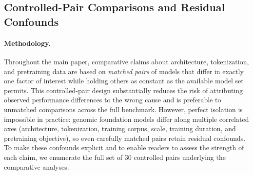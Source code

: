 \documentclass{llmxive}
\begin{document}
\subsection{Controlled-Pair Comparisons and Residual Confounds}
\label{subsec:controlled_pairs}

\paragraph{Methodology.}
Throughout the main paper, comparative claims about architecture,
tokenization, and pretraining data are based on \emph{matched pairs} of
models that differ in exactly one factor of interest while holding others
as constant as the available model set permits. This controlled-pair
design substantially reduces the risk of attributing observed performance
differences to the wrong cause and is preferable to unmatched comparisons
across the full benchmark. However, perfect isolation is impossible in
practice: genomic foundation models differ along multiple correlated
axes (architecture, tokenization, training corpus, scale, training
duration, and pretraining objective), so even carefully matched pairs
retain residual confounds. To make these confounds explicit and to enable
readers to assess the strength of each claim, we enumerate the full set
of $30$ controlled pairs underlying the comparative analyses.
\end{document}
